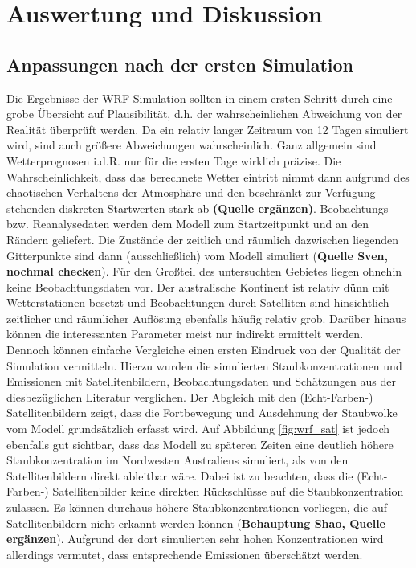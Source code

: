 \documentclass[12pt,a4paper,onecolumn,draft]{scrartcl}
\begin{document}
\section{Auswertung und Diskussion}
\subsection{Anpassungen nach der ersten Simulation}
Die Ergebnisse der WRF-Simulation sollten in einem ersten Schritt durch eine grobe Übersicht auf Plausibilität, d.h. der wahrscheinlichen Abweichung von der Realität überprüft werden. Da ein relativ langer Zeitraum von 12 Tagen simuliert wird, sind auch größere Abweichungen wahrscheinlich. Ganz allgemein sind Wetterprognosen i.d.R. nur für die ersten Tage wirklich präzise. Die Wahrscheinlichkeit, dass das berechnete Wetter eintritt nimmt dann aufgrund des chaotischen Verhaltens der Atmosphäre und den beschränkt zur Verfügung stehenden diskreten Startwerten stark ab \textbf{(Quelle ergänzen)}. Beobachtungs- bzw. Reanalysedaten werden dem Modell zum Startzeitpunkt und an den Rändern geliefert. Die Zustände der zeitlich und räumlich dazwischen liegenden Gitterpunkte sind dann (ausschließlich) vom Modell simuliert (\textbf{Quelle Sven, nochmal checken}). Für den Großteil des untersuchten Gebietes liegen ohnehin keine Beobachtungsdaten vor. Der australische Kontinent ist relativ dünn mit Wetterstationen besetzt und Beobachtungen durch Satelliten sind hinsichtlich  zeitlicher und räumlicher Auflösung ebenfalls häufig relativ grob. Darüber hinaus können die interessanten Parameter meist nur indirekt ermittelt werden.
\\

Dennoch können einfache Vergleiche einen ersten Eindruck von der Qualität der Simulation vermitteln. Hierzu wurden die simulierten Staubkonzentrationen und Emissionen mit Satellitenbildern, Beobachtungsdaten und Schätzungen aus der diesbezüglichen Literatur verglichen. Der Abgleich mit den (Echt-Farben-) Satellitenbildern zeigt, dass die Fortbewegung und Ausdehnung der Staubwolke vom Modell grundsätzlich erfasst wird. Auf Abbildung \ref{fig:wrf_sat} ist jedoch ebenfalls gut sichtbar, dass das Modell zu späteren Zeiten eine deutlich höhere Staubkonzentration im Nordwesten Australiens simuliert, als von den Satellitenbildern direkt ableitbar wäre. Dabei ist zu beachten, dass die (Echt-Farben-) Satellitenbilder keine direkten Rückschlüsse auf die Staubkonzentration zulassen. Es können durchaus höhere Staubkonzentrationen vorliegen, die auf Satellitenbildern nicht erkannt werden können (\textbf{Behauptung Shao, Quelle ergänzen}). Aufgrund der dort simulierten sehr hohen Konzentrationen wird allerdings vermutet, dass entsprechende Emissionen überschätzt werden.
\end{document}
